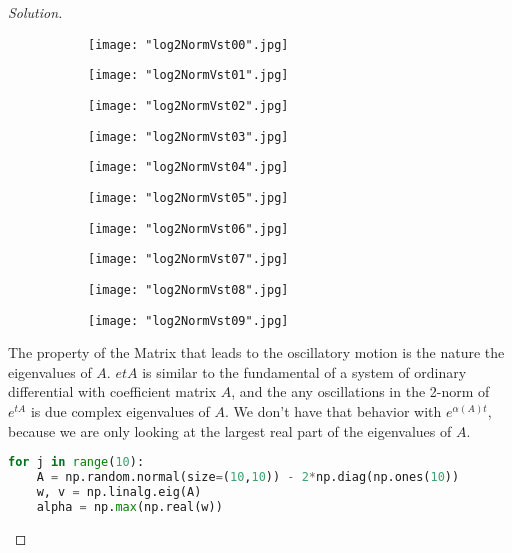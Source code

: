 \documentclass{article}
\begin{document}
	\begin{proof}[Solution]
	
	\begin{figure}[h!]
	\centering
		\begin{subfigure}[b]{0.3\linewidth}
		\texttt{[image: "log2NormVst00".jpg]} 
  		\end{subfigure}
  		\begin{subfigure}[b]{0.3\linewidth}
		\texttt{[image: "log2NormVst01".jpg]} 
  		\end{subfigure}
  		\begin{subfigure}[b]{0.3\linewidth}
		\texttt{[image: "log2NormVst02".jpg]} 
  		\end{subfigure}
  		\begin{subfigure}[b]{0.3\linewidth}
		\texttt{[image: "log2NormVst03".jpg]} 
  		\end{subfigure}
  		\begin{subfigure}[b]{0.3\linewidth}
		\texttt{[image: "log2NormVst04".jpg]} 
  		\end{subfigure}
  		\begin{subfigure}[b]{0.3\linewidth}
		\texttt{[image: "log2NormVst05".jpg]} 
  		\end{subfigure}
  		\begin{subfigure}[b]{0.3\linewidth}
		\texttt{[image: "log2NormVst06".jpg]} 
  		\end{subfigure}
  		\begin{subfigure}[b]{0.3\linewidth}
		\texttt{[image: "log2NormVst07".jpg]} 
  		\end{subfigure}
  		\begin{subfigure}[b]{0.3\linewidth}
		\texttt{[image: "log2NormVst08".jpg]} 
  		\end{subfigure}
  		\begin{subfigure}[b]{0.3\linewidth}
		\texttt{[image: "log2NormVst09".jpg]} 
  		\end{subfigure}
	\end{figure}
	The property of the Matrix that leads to the oscillatory motion is the nature the eigenvalues of $A$. $e{tA}$ is similar to the fundamental of a system of ordinary differential with coefficient matrix $A$, and the any oscillations in the 2-norm of $e^{tA}$ is due complex eigenvalues of $A$. We don't have that behavior with $e^{\alpha(A)t}$, because we are only looking at the largest real part of the eigenvalues of $A$.
	\begin{lstlisting}[language=python]
for j in range(10):
	A = np.random.normal(size=(10,10)) - 2*np.diag(np.ones(10))
	w, v = np.linalg.eig(A)
	alpha = np.max(np.real(w))


\end{lstlisting}
\end{proof}
\end{document}
